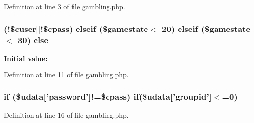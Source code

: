 Definition at line 3 of file gambling.\+php.

\hypertarget{gambling_8php_a7881d147b70c603cf3b0f3dce600efe0}{
\subsubsection[{else}]{ (!\$cuser$\vert$$\vert$!\$cpass) {\bf elseif} (\$gamestate$<$ 20) {\bf elseif} (\$gamestate$<$ 30) else}}\label{gambling_8php_a7881d147b70c603cf3b0f3dce600efe0}
{\bfseries Initial value\+:}


Definition at line 11 of file gambling.\+php.

\hypertarget{gambling_8php_a2b37557b506ea2914ac1f29fa05dda34}{
\subsubsection[{if}]{\setlength{\rightskip}{0pt plus 5cm}if (\$udata\mbox{[}'password'\mbox{]}!=\$cpass) if(\$udata\mbox{[}'groupid'\mbox{]}$<$=0)}}\label{gambling_8php_a2b37557b506ea2914ac1f29fa05dda34}


Definition at line 16 of file gambling.\+php.

